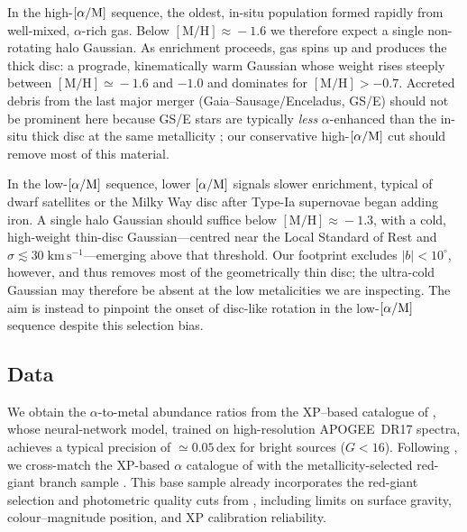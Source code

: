 \documentclass[a4paper,12pt]{article}
\begin{document}
In the high-$[\alpha/{\rm M}]$ sequence, the oldest, in-situ population formed rapidly from well-mixed,
$\alpha$-rich gas. Below $[\mathrm{M/H}]\!\approx\!-1.6$ we therefore
expect a single non-rotating halo Gaussian.  As enrichment proceeds,
gas spins up and produces the thick disc: a prograde, kinematically
warm Gaussian whose weight rises steeply between
$[\mathrm{M/H}]\!\simeq\!-1.6$ and $-1.0$ and dominates for
$[\mathrm{M/H}]>-0.7$.  Accreted debris from the last major merger
(Gaia–Sausage/Enceladus, GS/E) should not be prominent here
because GS/E stars are typically \emph{less} $\alpha$-enhanced than the
in-situ thick disc at the same metallicity
\citep[e.g.][]{Helmi2018}; our conservative
high-$[\alpha/{\rm M}]$ cut should remove most of this material.

In the low-$[\alpha/{\rm M}]$ sequence,
lower $[\alpha/{\rm M}]$ signals slower enrichment, typical of dwarf
satellites or the Milky Way disc after Type-Ia supernovae began adding
iron.  A single halo Gaussian should suffice below
$[\mathrm{M/H}]\!\approx\!-1.3$, with a cold, high-weight thin-disc
Gaussian—centred near the Local Standard of Rest and
$\sigma\!\lesssim\!30\;\mathrm{km\,s^{-1}}$—emerging above that
threshold.  Our footprint excludes $|b|<10^{\circ}$, however, and thus
removes most of the geometrically thin disc; the ultra-cold Gaussian
may therefore be absent at the low metalicities we are inspecting. 
 The aim is instead to pinpoint the onset
of disc-like rotation in the low-$[\alpha/{\rm M}]$ sequence despite
this selection bias.





\subsection{Data}
\label{subsec:data_vis}


We obtain the $\alpha$-to-metal abundance ratios from the
XP–based catalogue of \citet{Li2024}, whose neural-network
model, trained on high-resolution \textsc{APOGEE}~DR17
spectra, achieves a typical precision of $\simeq0.05$\,dex for
bright sources ($G<16$).  
Following \citet{Vis2024}, we cross-match the XP-based $\alpha$ catalogue 
of \citet{Li2024} with the metallicity-selected red-giant branch sample . This base sample already 
incorporates the red-giant selection and photometric quality cuts from 
\citet{Andrae2023}, including limits on surface gravity, colour–magnitude 
position, and XP calibration reliability. 
\end{document}
